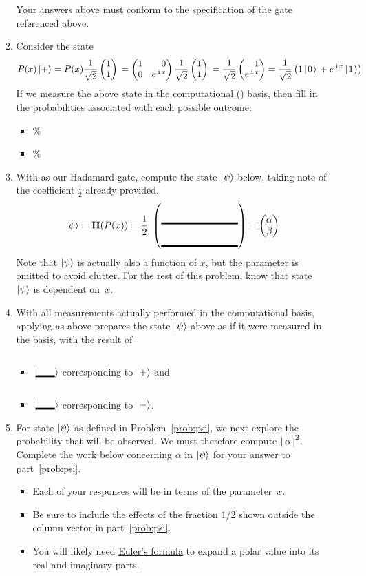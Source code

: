 \documentclass[12pt]{article}
\begin{document}
\begin{enumerate}
\begin{enumerate}[label=\theenumi.\arabic*]
\[  \]
  Your answers above must conform to the specification of the  gate referenced above.
  \item{} Consider the state \[
  P(x)\ket{+} = P(x)\PPlus{}= \SQBG{\relax}{1}{0}{0}{\ExpPhase{x}}\PPlus{} =\RootTwo{}\SQB{1}{\ExpPhase{x}} = \TwoSupOp{1\QZero{}}{\ExpPhase{x}\QOne}{+}
  \]
  If we measure the above state in the computational (\PauliZ{}) basis, then fill in the probabilities associated with each possible outcome:
  \begin{itemize}
      \item \QZero{} \Blank{}\%
      \item \QOne{} \Blank{}\%
  \end{itemize}
  \item\label{prob:psi} With \Hadamard{} as our Hadamard gate, compute the state $\ket{\psi}$ below, taking note of the coefficient $\frac{1}{2}$ already provided.
  \[
  \ket{\psi} = \Hadamard(P(x)) = \frac{1}{2}\ \SQB{\Blank[8em]}{\Blank[8em]} = \SQB{\alpha}{\beta}
  \]
  Note that $\ket{\psi}$ is actually also a function of $x$, but the parameter is omitted to avoid clutter.  For the rest of this problem, know that state~$\ket{\psi}$ is dependent on~$x$.
  \item{} With all measurements actually performed in the computational basis, applying \Hadamard{} as above prepares the state $\ket{\psi}$ above as if it were measured in the \Blank[2em]{} basis, with the result of \begin{itemize}
      \item $\ket{\Blank[2em]}$ corresponding to $\ket{+}$ and 
      \item $\ket{\Blank[2em]}$  corresponding to $\ket{-}$.
   \end{itemize}
  \item{} For state $\ket{\psi}$ as defined in Problem~\ref{prob:psi}, we next explore the probability that \QZero{} will be observed. We must therefore compute ${{|\,\alpha\,|}}^{2}$. Complete the work below concerning $\alpha$ in $\ket{\psi}$ for your answer to part~\ref{prob:psi}.  
  \begin{itemize} 
  \item Each of your responses will be in terms of the parameter~$x$.
  \item Be sure to include the effects of the fraction $1/2$ shown outside the column vector in part~\ref{prob:psi}.
  
  
  \item You will likely need \href{https://en.wikipedia.org/wiki/Euler%27s_formula}{Euler's formula} to expand a polar value into its real and imaginary parts. 
  \end{itemize}
  

\end{enumerate}
\end{enumerate}
\end{document}
